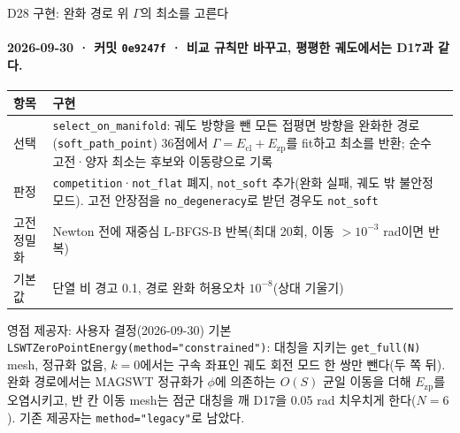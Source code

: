 \begin{frame}[label=d28-implementation]{D28 구현: 완화 경로 위 $\Gamma$의 최소를 고른다}
  \framesubtitle{2026-09-30 · 커밋 \texttt{0e9247f} · 비교 규칙만 바꾸고, 평평한 궤도에서는 D17과 같다.}
  \footnotesize\renewcommand{\arraystretch}{1.1}
  \begin{tabularx}{\textwidth}{@{}P{2.7cm}Y@{}}
    \toprule
    항목 & 구현 \\
    \midrule
    선택 & \texttt{select\_on\_manifold}: 궤도 방향을 뺀 모든 접평면 방향을 완화한 경로(\texttt{soft\_path\_point}) 36점에서 $\Gamma=E_{\mathrm{cl}}+E_{\mathrm{zp}}$를 fit하고 최소를 반환; 순수 고전·양자 최소는 후보와 이동량으로 기록 \\
    판정 & \texttt{competition}·\texttt{not\_flat} 폐지, \texttt{not\_soft} 추가(완화 실패, 궤도 밖 불안정 모드). 고전 안장점을 \texttt{no\_degeneracy}로 받던 경우도 \texttt{not\_soft} \\
    고전 정밀화 & Newton 전에 재중심 L-BFGS-B 반복(최대 20회, 이동 $>10^{-3}$ rad이면 반복) \\
    기본값 & 단열 비 경고 0.1, 경로 완화 허용오차 $10^{-8}$(상대 기울기) \\
    \bottomrule
  \end{tabularx}
  \par\medskip
  \begin{mdcallout}[note]{영점 제공자: 사용자 결정(2026-09-30)}
    기본 \texttt{LSWTZeroPointEnergy(method="constrained")}: 대칭을 지키는 \texttt{get\_full(N)} mesh, 정규화 없음, $k=0$에서는 구속 좌표인 궤도 회전 모드 한 쌍만 뺀다(두 쪽 뒤).
    완화 경로에서는 MAGSWT 정규화가 $\phi$에 의존하는 $O(S)$ 균일 이동을 더해 $E_{\mathrm{zp}}$를 오염시키고, 반 칸 이동 mesh는 점군 대칭을 깨 D17을 0.05 rad 치우치게 한다($N=6$).
    기존 제공자는 \texttt{method="legacy"}로 남았다.
  \end{mdcallout}
\end{frame}

